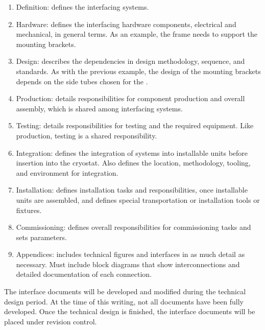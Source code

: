 \begin{enumerate}
 \item Definition: defines the interfacing systems.
 \item Hardware: defines the interfacing hardware components,
   electrical and mechanical, in general terms. As an
   example, the  frame needs to support the 
   mounting brackets.
 \item Design: describes the dependencies in design
   methodology, sequence, and standards. As with the
   previous example, the design of the  mounting
   brackets depends on the side tubes chosen for the .
 \item Production: details responsibilities for component production and overall assembly, which is
    shared among interfacing systems. %
 \item Testing: details responsibilities for testing and  the required equipment. Like production, testing is a shared  responsibility. 
 \item Integration: defines the integration of systems into installable units
   before insertion into the cryostat. %
   Also defines the location, methodology, tooling, and environment for integration. %
 \item Installation: defines installation tasks and responsibilities, once
   installable units are assembled, and  defines  %
   special transportation or installation tools or fixtures. %
 \item Commissioning: defines overall responsibilities for
   commissioning tasks  and sets parameters. %
 \item Appendices: includes technical figures and interfaces %
   in as much detail as necessary. Must include block diagrams that
   show interconnections and detailed documentation of each connection.
\end{enumerate}


The interface documents will be developed and modified during the
technical design period. At the time of this writing, not all
documents have been fully developed. Once the technical design is
finished, the interface documents will be placed under revision
control.

